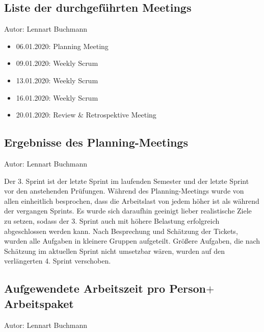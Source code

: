 \subsection{Liste der durchgeführten Meetings}
{\small Autor: Lennart Buchmann}

\begin{itemize}
  \item 06.01.2020: Planning Meeting
  \item 09.01.2020: Weekly Scrum
  \item 13.01.2020: Weekly Scrum
  \item 16.01.2020: Weekly Scrum
  \item 20.01.2020: Review &  Retrospektive Meeting
\end{itemize}


\subsection{Ergebnisse des Planning-Meetings}
{\small Autor: Lennart Buchmann}

Der 3. Sprint ist der letzte Sprint im laufenden Semester und der letzte Sprint vor den anstehenden Prüfungen. Während des Planning-Meetings wurde von allen einheitlich besprochen, dass die
Arbeitslast von jedem höher ist als während der vergangen Sprints. Es wurde sich daraufhin geeinigt lieber realistische Ziele zu setzen, sodass der 3. Sprint auch mit höhere Belastung erfolgreich 
abgeschlossen werden kann. Nach Besprechung und Schätzung der Tickets, wurden alle Aufgaben in kleinere Gruppen aufgeteilt. Größere Aufgaben, die nach Schätzung im aktuellen Sprint nicht umsetzbar wären, wurden auf den verlängerten 4. Sprint verschoben. 


\subsection{Aufgewendete Arbeitszeit pro Person$+$Arbeitspaket}
{\small Autor: Lennart Buchmann}

